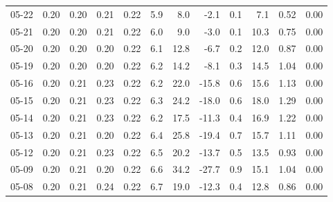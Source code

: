 \begin{threeparttable}
{\begin{tabular}{lrrrrrrrrrrr}
  05-22 &          0.20 &          0.20 &          0.21 &        0.22 &                 5.9 &                 8.0 &       -2.1 &                 0.1 &              7.1 &            0.52 &                   0.00 \\
  05-21 &          0.20 &          0.20 &          0.21 &        0.22 &                 6.0 &                 9.0 &       -3.0 &                 0.1 &             10.3 &            0.75 &                   0.00 \\
  05-20 &          0.20 &          0.20 &          0.20 &        0.22 &                 6.1 &                12.8 &       -6.7 &                 0.2 &             12.0 &            0.87 &                   0.00 \\
  05-19 &          0.20 &          0.20 &          0.20 &        0.22 &                 6.2 &                14.2 &       -8.1 &                 0.3 &             14.5 &            1.04 &                   0.00 \\
  05-16 &          0.20 &          0.21 &          0.23 &        0.22 &                 6.2 &                22.0 &      -15.8 &                 0.6 &             15.6 &            1.13 &                   0.00 \\
  05-15 &          0.20 &          0.21 &          0.23 &        0.22 &                 6.3 &                24.2 &      -18.0 &                 0.6 &             18.0 &            1.29 &                   0.00 \\
  05-14 &          0.20 &          0.21 &          0.23 &        0.22 &                 6.2 &                17.5 &      -11.3 &                 0.4 &             16.9 &            1.22 &                   0.00 \\
  05-13 &          0.20 &          0.21 &          0.20 &        0.22 &                 6.4 &                25.8 &      -19.4 &                 0.7 &             15.7 &            1.11 &                   0.00 \\
  05-12 &          0.20 &          0.21 &          0.23 &        0.22 &                 6.5 &                20.2 &      -13.7 &                 0.5 &             13.5 &            0.93 &                   0.00 \\
  05-09 &          0.20 &          0.21 &          0.20 &        0.22 &                 6.6 &                34.2 &      -27.7 &                 0.9 &             15.1 &            1.04 &                   0.00 \\
  05-08 &          0.20 &          0.21 &          0.24 &        0.22 &                 6.7 &                19.0 &      -12.3 &                 0.4 &             12.8 &            0.86 &                   0.00 \\

\end{tabular}}
\end{threeparttable}
